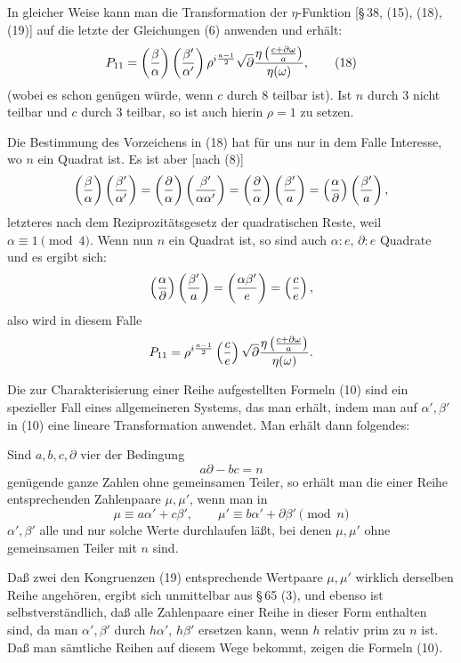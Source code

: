 \documentclass[11pt]{article}
\begin{document}
In gleicher Weise kann man die Transformation der $\eta$-Funktion [\S\,38, (15), (18),
(19)] auf die letzte der Gleichungen (6) anwenden und erhält:
\begin{equation}
 P_{11}=\left({\beta\over\alpha}\right)
 \left({\beta'\over\alpha'}\right)\rho^{i\frac{a-1}{2}}
 \sqrt{\partial}
 {\eta\left({c+\partial\omega\over a}\right)\over\eta(\omega)},
\tag{18}
\end{equation}
(wobei es schon genügen würde, wenn $c$ durch 8 teilbar ist). Ist $n$ durch 3 nicht
teilbar und $c$ durch 3 teilbar, so ist auch hierin $\rho=1$ zu setzen.

Die Bestimmung des Vorzeichens in (18) hat für uns nur in dem Falle Interesse, wo $n$ ein
Quadrat ist. Es ist aber [nach (8)]
\[
 \left({\beta\over\alpha}\right)
 \left({\beta'\over\alpha'}\right)
 =\left({\partial\over\alpha}\right)
 \left({\beta'\over\alpha\alpha'}\right)
 =\left({\partial\over\alpha}\right)
 \left({\beta'\over a}\right)
 =\left({\alpha\over\partial}\right)
 \left({\beta'\over a}\right),
\]
letzteres nach dem Reziprozitätsgesetz der quadratischen Reste, weil $\alpha\equiv1\pmod4$.
Wenn nun $n$ ein Quadrat ist, so sind auch $\alpha:e$, $\partial:e$ Quadrate und es ergibt
sich:
\[
 \left({\alpha\over\partial}\right)
 \left({\beta'\over a}\right)
 =\left({\alpha\beta'\over e}\right)=\left({c\over e}\right),
\]
also wird in diesem Falle
\[
 P_{11}=\rho^{i\frac{a-1}{2}}
 \left({c\over e}\right)\sqrt{\partial}
 {\eta\left({c+\partial\omega\over a}\right)\over \eta(\omega)}.
\]

Die zur Charakterisierung einer Reihe aufgestellten Formeln (10) sind ein spezieller Fall
eines allgemeineren Systems, das man erhält, indem man auf $\alpha',\beta'$ in (10) eine
lineare Transformation anwendet. Man erhält dann folgendes:

Sind $a,b,c,\partial$ vier der Bedingung
\[
 a\partial-bc=n
\]
genügende ganze Zahlen ohne gemeinsamen Teiler, so erhält man die einer Reihe
entsprechenden Zahlenpaare $\mu,\mu'$, wenn man in
\begin{equation}
 \mu\equiv a\alpha'+c\beta',
 \qquad
 \mu'\equiv b\alpha'+\partial\beta'\pmod n
\tag{19}
\end{equation}
$\alpha',\beta'$ alle und nur solche Werte durchlaufen läßt, bei denen $\mu,\mu'$ ohne
gemeinsamen Teiler mit $n$ sind.

Daß zwei den Kongruenzen (19) entsprechende Wertpaare $\mu,\mu'$ wirklich derselben
Reihe angehören, ergibt sich unmittelbar aus \S\,65 (3), und ebenso ist selbstverständlich,
daß alle Zahlenpaare einer Reihe in dieser Form enthalten sind, da man $\alpha',\beta'$ durch
$h\alpha'$, $h\beta'$ ersetzen kann, wenn $h$ relativ prim zu $n$ ist. Daß man sämtliche
Reihen auf diesem Wege bekommt, zeigen die Formeln (10).
\end{document}

